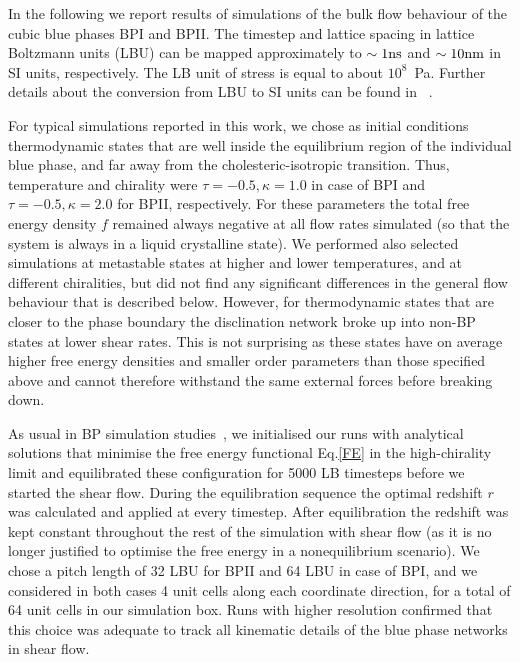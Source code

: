 \documentclass[aps,pre,reprint,superscriptaddress, twocolumn]{revtex4}
\begin{document}
In the following we report results of simulations of the bulk flow behaviour of the cubic blue 
phases BPI and BPII. 
The timestep and lattice spacing in lattice Boltzmann units (LBU) can be mapped
approximately to $\sim 1 {\rm ns}$ and $\sim 10{\rm nm}$ in SI units, respectively. The LB unit of stress
is equal to about $10^8$~Pa. Further details about the conversion 
from LBU to SI units can be found in ~\cite{Henrich:2011a,Henrich:2010b}.

For typical simulations reported in this work, 
we chose as initial conditions thermodynamic states that are 
well inside the equilibrium region of the individual blue phase, and far away 
from the cholesteric-isotropic transition. Thus, temperature and chirality were 
$\tau=-0.5, \kappa=1.0$ in case of BPI and $\tau=-0.5, \kappa=2.0$ for BPII, respectively.
For these parameters the total free energy density $f$ remained always negative at all flow rates
simulated (so that the system is always in a liquid crystalline state). 
We performed also selected simulations at metastable states at higher and lower temperatures, 
and at different chiralities, but did not find any significant differences in the 
general flow behaviour that is described below.
However, for thermodynamic states that are closer to the phase boundary the disclination 
network broke up into non-BP states at lower shear rates. This is not surprising as
these states have on average higher free energy densities and smaller order parameters
than those specified above and cannot therefore withstand the same external forces
before breaking down.

As usual in BP simulation studies~\cite{Henrich:2011a,Henrich:2010b}, we initialised our runs with 
analytical solutions that minimise the free energy functional Eq.\ref{FE} in the high-chirality limit 
and equilibrated these configuration for 5000 LB timesteps before we started the shear flow. 
During the equilibration sequence the optimal redshift $r$ was calculated and applied at every timestep.
After equilibration the redshift was kept constant throughout the rest of the simulation with shear flow (as 
it is no longer justified to optimise the free energy in a nonequilibrium scenario).
We chose a pitch length of 32 LBU for BPII and 64 LBU in case of BPI, and we considered in both cases 
4 unit cells along each coordinate direction, for a total of 64 unit cells in our simulation box.
Runs with higher resolution confirmed that this choice was adequate to track  
all kinematic details of the blue phase networks in shear flow.
\end{document}
